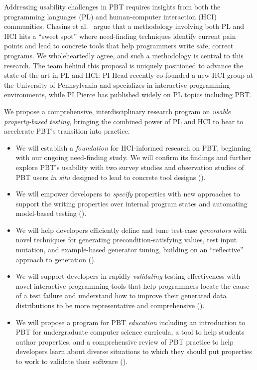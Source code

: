 Addressing usability challenges in PBT requires insights from both the
programming languages (PL) and
human-computer interaction (HCI) communities.  Chasins et
al.~\cite{chasins_pl_2021} argue that a methodology
involving
both PL and HCI hits a ``sweet spot'' where need-finding techniques identify
current pain points and lead to concrete tools that help programmers write
safe, correct programs. We wholeheartedly agree, and such a methodology is
central to this research.
The team behind this proposal is uniquely positioned to advance the
state of the art in PL and HCI: PI Head recently co-founded
a new HCI group at the University of Pennsylvania and specializes in interactive
programming environments, while PI Pierce has
published widely on PL topics including PBT.

We propose a comprehensive, interdisciplinary research program on \emph{usable
property-based testing}, bringing the combined power of PL and HCI to bear to
accelerate PBT's transition into practice.
\begin{itemize}[noitemsep]
\item We will establish a \emph{foundation} for HCI-informed research on PBT,
beginning with our ongoing need-finding study. We will confirm
its findings and further explore PBT's usability with
two survey studies and observation studies
of PBT users {\em in situ} designed to lead to concrete tool designs
().
  \item We will empower developers to \emph{specify} properties with new approaches
to support the writing properties over internal program states and
automating model-based testing ().
  \item We will help developers efficiently define and tune test-case
\emph{generators} with novel techniques for generating precondition-satisfying
values, test input mutation, and example-based generator tuning, building
  on an ``reflective'' approach to generation ().
  \item We will support developers in rapidly \emph{validating} testing
  effectiveness with novel interactive programming tools that help programmers
locate the cause of a test failure and understand how to improve their generated
data distributions to be more representative and comprehensive
().
  \item We will propose a program for PBT \emph{education} including
  an introduction to PBT for undergraduate
  computer science curricula, a tool to help students author
  properties, and a comprehensive review of PBT practice
  to help developers learn about diverse situations to which they should
  put properties to work to validate their software
  ().
\end{itemize}

